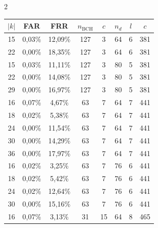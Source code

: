 \begin{multicols}{2}
\begin{center}
{\begin{tabular}{|c|c|c|c|c|c|c|c|}

      \hline

$\vert k\vert$&FAR&FRR&$n_{\mathrm{BCH}}$&$c$&$n_d$&$l$&$c$\\

\hline

      

15&0,03\%&12,09\%&127\hphantom{9}&\hphantom{9}3&64&6&381\\

22&0,00\%&18,35\%&127\hphantom{9}&\hphantom{9}3&64&6&381\\

\hline

15&0,03\%&11,11\%&127\hphantom{9}&\hphantom{9}3&80&5&381\\

22&0,00\%&14,08\%&127\hphantom{9}&\hphantom{9}3&80&5&381\\

29&0,00\%&16,97\%&127\hphantom{9}&\hphantom{9}3&80&5&381\\

\hline

16&0,07\%&\hphantom{9}4,67\%&63&\hphantom{9}7&64&7&441\\

18&0,02\%&\hphantom{9}5,38\%&63&\hphantom{9}7&64&7&441\\

24&0,00\%&11,54\%&63&\hphantom{9}7&64&7&441\\

30&0,00\%&14,29\%&63&\hphantom{9}7&64&7&441\\

36&0,00\%&17,97\%&63&\hphantom{9}7&64&7&441\\

\hline

16&0,02\%&\hphantom{9}3,25\%&63&\hphantom{9}7&76&6&441\\

18&0,02\%&\hphantom{9}5,42\%&63&\hphantom{9}7&76&6&441\\

24&0,02\%&12,64\%&63&\hphantom{9}7&76&6&441\\

30&0,00\%&15,16\%&63&\hphantom{9}7&76&6&441\\

\hline

16&0,07\%&\hphantom{9}3,13\%&31&15&64&8&465\\


\end{tabular}}
\end{center}
\end{multicols}
